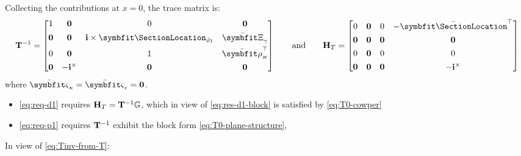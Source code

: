 Collecting the contributions at $x = 0$, the trace matrix is:
\begin{equation}
\TraceDeDpRoot = \begin{bmatrix}
1 & \mathbf{0} & 0 & \mathbf{0} %
\\[4pt]
\mathbf{0} 
& \mathbf{0} %
& \FrameBasis \times \CenterTwistLocation & \TraceFF \\[4pt]
0 & \mathbf{0} & 1 & \TraceTF^\top %
\\[4pt]
\mathbf{0} & -\FrameBasis^\times & \mathbf{0} & \mathbf{0} %
\end{bmatrix}
\qquad\text{and}\qquad 
\TraceDeDpOne = \begin{bmatrix}
0 & \mathbf{0} & 0 & -\CentroidLocation^\top \\[4pt]
\mathbf{0} & \mathbf{0} & \mathbf{0} & \mathbf{0} \\[4pt]
0 & \mathbf{0} & 0 & 0 \\[4pt]
\mathbf{0} & \mathbf{0} & \mathbf{0} & -\FrameBasis^\times
\end{bmatrix}
\label{eq:T0-cowper}
\end{equation}
where \(\TraceBT = \TraceNF = \mathbf{0}\). 
\begin{itemize}
    \item \eqref{eq:req-d1} requires \({\mathbf{H}}_T = {\mathbf{T}^{-1}}\mathbb{G}\), which in view of \eqref{eq:res-d1-block} is satisfied by \eqref{eq:T0-cowper}
    \item \eqref{eq:req-p1} requires \({\mathbf{T}^{-1}}\) exhibit the block form \eqref{eq:T0-plane-structure}, 
\end{itemize}
In view of \eqref{eq:Tinv-from-T}:%
